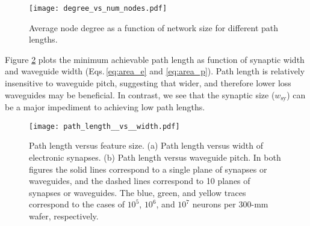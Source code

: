\documentclass[twocolumn]{article}
\begin{document}
\begin{figure}[!h]
    \centering
    \texttt{[image: degree\_vs\_num\_nodes.pdf]}
    \caption{Average node degree as a function of network size for different path lengths.}
    \label{fig:degree}
\end{figure}

Figure \ref{fig:path_length__vs__width} plots the minimum achievable path length as function of synaptic width and waveguide width (Eqs.\,\ref{eq:area_e} and \ref{eq:area_p}). Path length is relatively insensitive to waveguide pitch, suggesting that wider, and therefore lower loss waveguides may be beneficial. In contrast, we see that the synaptic size ($w_{\mathrm{sy}}$) can be a major impediment to achieving low path lengths. 

\begin{figure}[!h]
    \centering
    \texttt{[image: path\_length\_\_vs\_\_width.pdf]}
    \caption{Path length versus feature size. (a) Path length versus width of electronic synapses. (b) Path length versus waveguide pitch. In both figures the solid lines correspond to a single plane of synapses or waveguides, and the dashed lines correspond to 10 planes of synapses or waveguides. The blue, green, and yellow traces correspond to the cases of $10^5$, $10^6$, and $10^7$ neurons per 300-mm wafer, respectively.}
    \label{fig:path_length__vs__width}
\end{figure}



\end{document}
